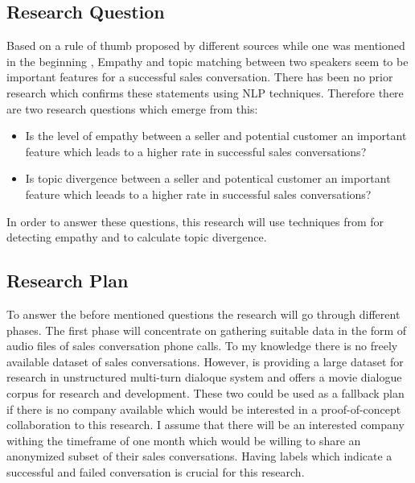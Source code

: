 \documentclass[twoside]{article}
\begin{document}
\begin{multicols}{2}
\subsection{Research Question}

Based on a rule of thumb proposed by different sources while one was mentioned in the beginning \cite{effectiveSalesConversations2018}, Empathy and topic matching between two speakers seem to be important features for a successful sales conversation. There has been no prior research which confirms these statements using NLP techniques. Therefore there are two research questions which emerge from this:

\begin{itemize}
	\item Is the level of empathy between a seller and potential customer an important feature which leads to a higher rate in successful sales conversations?
	\item Is topic divergence between a seller and potentical customer an important feature which leeads to a higher rate in successful sales conversations?
\end{itemize}

In order to answer these questions, this research will use techniques from \cite{Alam2017} for detecting empathy and \cite{topicmodels2007} to calculate topic divergence.



\subsection{Research Plan}

To answer the before mentioned questions the research will go through different phases. The first phase will concentrate on gathering suitable data in the form of audio files of sales conversation phone calls. To my knowledge there is no freely available dataset of sales conversations. However, \cite{Lowe2015} is providing a large dataset for research in unstructured multi-turn dialoque system and \cite{Moviedic} offers a movie dialogue corpus for research and development. These two could be used as a fallback plan if there is no company available which would be interested in a proof-of-concept collaboration to this research. I assume that there will be an interested company withing the timeframe of one month which would be willing to share an anonymized subset of their sales conversations. Having labels which indicate a successful and failed conversation is crucial for this research.



\end{multicols}
\end{document}
